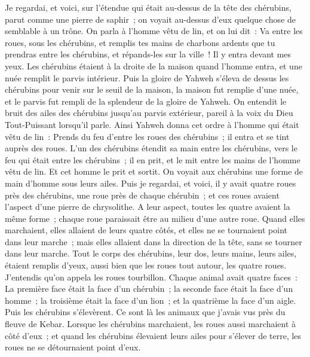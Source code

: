 \begin{multicols}{2}
\VerseOne{}Je regardai, et voici, sur l'étendue qui était au-dessus de la tête des chérubins, parut comme une pierre de saphir~; on voyait au-dessus d'eux quelque chose de semblable à un trône.
On parla à l'homme vêtu de lin, et on lui dit~: Va entre les roues, sous les chérubins, et remplis tes mains de charbons ardents que tu prendras entre les chérubins, et répands-les sur la ville~! Il y entra devant mes yeux.
Les chérubins étaient à la droite de la maison quand l'homme entra, et une nuée remplit le parvis intérieur.
Puis la gloire de Yahweh s'éleva de dessus les chérubins pour venir sur le seuil de la maison, la maison fut remplie d'une nuée, et le parvis fut rempli de la splendeur de la gloire de Yahweh.
On entendit le bruit des ailes des chérubins jusqu'au parvis extérieur, pareil à la voix du Dieu Tout-Puissant lorsqu'il parle.
Ainsi Yahweh donna cet ordre à l'homme qui était vêtu de lin~: Prends du feu d'entre les roues des chérubins~; il entra et se tint auprès des roues.
L'un des chérubins étendit sa main entre les chérubins, vers le feu qui était entre les chérubins~; il en prit, et le mit entre les mains de l'homme vêtu de lin. Et cet homme le prit et sortit.
On voyait aux chérubins une forme de main d'homme sous leurs ailes.
Puis je regardai, et voici, il y avait quatre roues près des chérubins, une roue près de chaque chérubin~; et ces roues avaient l'aspect d'une pierre de chrysolithe.
A leur aspect, toutes les quatre avaient la même forme~; chaque roue paraissait être au milieu d'une autre roue.
Quand elles marchaient, elles allaient de leurs quatre côtés, et elles ne se tournaient point dans leur marche~; mais elles allaient dans la direction de la tête, sans se tourner dans leur marche.
Tout le corps des chérubins, leur dos, leurs mains, leurs ailes, étaient remplis d'yeux, aussi bien que les roues tout autour, les quatre roues.
J'entendis qu'on appela les roues tourbillon.
Chaque animal avait quatre faces~: La première face était la face d'un chérubin~; la seconde face était la face d'un homme~; la troisième était la face d'un lion~; et la quatrième la face d'un aigle.
Puis les chérubins s'élevèrent. Ce sont là les animaux que j'avais vus près du fleuve de Kebar.
Lorsque les chérubins marchaient, les roues aussi marchaient à côté d'eux~; et quand les chérubins élevaient leurs ailes pour s'élever de terre, les roues ne se détournaient point d'eux.

\end{multicols}
